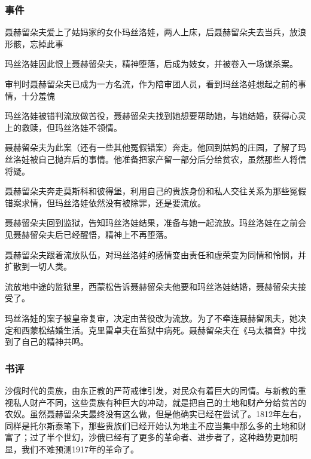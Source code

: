 \subsubsection{事件}
\begin{itemize*}
    \item 聂赫留朵夫爱上了姑妈家的女仆玛丝洛娃，两人上床，后聂赫留朵夫去当兵，放浪形骸，忘掉此事
    \item 玛丝洛娃因此恨上聂赫留朵夫，精神堕落，后成为妓女，并被卷入一场谋杀案。
    \item 审判时聂赫留朵夫已成为一方名流，作为陪审团人员，看到玛丝洛娃想起之前的事情，十分羞愧
    \item 玛丝洛娃被错判流放做苦役，聂赫留朵夫找到她想要帮助她，与她结婚，获得心灵上的救赎，但玛丝洛娃不领情。
    \item 聂赫留朵夫为此案（还有一些其他冤假错案）奔走。他回到姑妈的庄园，了解了玛丝洛娃被自己抛弃后的事情。他准备把家产留一部分后分给贫农，虽然那些人将信将疑。
    \item 聂赫留朵夫奔走莫斯科和彼得堡，利用自己的贵族身份和私人交往关系为那些冤假错案求情，但玛丝洛娃依然没有被除罪，还是要流放。
    \item 聂赫留朵夫回到监狱，告知玛丝洛娃结果，准备与她一起流放。玛丝洛娃在之前会见聂赫留朵夫后已经醒悟，精神上不再堕落。
    \item 聂赫留朵夫跟着流放队伍，对玛丝洛娃的感情变由责任和虚荣变为同情和怜悯，并扩散到一切人类。
    \item 流放地中途的监狱里，西蒙松告诉聂赫留朵夫他要和玛丝洛娃结婚，聂赫留朵夫接受了。
    \item 玛丝洛娃的案子被皇帝复审，决定由苦役改为流放。为了不牵连聂赫留凩夫，她决定和西蒙松结婚生活。克里雷卓夫在监狱中病死。聂赫留朵夫在《马太福音》中找到了自己的精神共鸣。
\end{itemize*}

\subsubsection{书评}

沙俄时代的贵族，由东正教的严苛戒律引发，对民众有着巨大的同情。与新教的重视私人财产不同，这些贵族有种巨大的冲动，就是把自己的土地和财产分给贫苦的农奴。虽然聂赫留朵夫最终没有这么做，但是他确实已经在尝试了。1812年左右，同样是托尔斯泰笔下，那些贵族们已经开始认为地主不应当集中那么多的土地和财富了；过了半个世幻，沙俄已经有了更多的革命者、进步者了，这种趋势更加明显，我们不难预测1917年的革命了。


